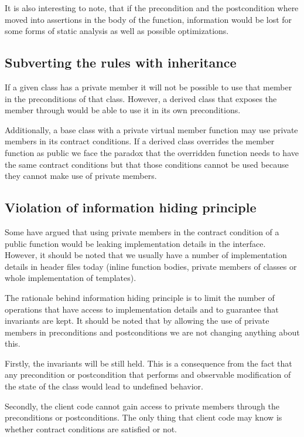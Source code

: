 It is also interesting to note, that if the precondition and the postcondition
where moved into assertions in the body of the function, information would be lost
for some forms of static analysis as well as possible optimizations.

\subsection{Subverting the rules with inheritance}

If a given class has a private member it will not be possible to use that member
in the preconditions of that class. However, a derived class that exposes the
member through  would be able to use it in its own preconditions.

Additionally, a base class with a private virtual member function may use private
members in its contract conditions. If a derived class overrides the member
function as public we face the paradox that the overridden function needs to have
the same contract conditions but that those conditions cannot be used because
they cannot make use of private members.

\subsection{Violation of information hiding principle}

Some have argued that using private members in the contract condition of a
public function would be leaking implementation details in the interface.
However, it should be noted that we usually have a number of implementation
details in header files today (inline function bodies, private members of
classes or whole implementation of templates).

The rationale behind information hiding principle is to limit the number of
operations that have access to implementation details and to guarantee that
invariants are kept. It should be noted that by allowing the use of private
members in preconditions and postconditions we are not changing anything about
this.

Firstly, the invariants will be still held. This is a consequence from the fact
that any precondition or postcondition that performs and observable modification
of the state of the class would lead to undefined behavior.

Secondly, the client code cannot gain access to private members through the
preconditions or postconditions. The only thing that client code may know is
whether contract conditions are satisfied or not.

